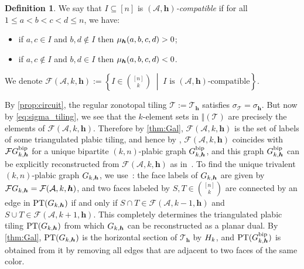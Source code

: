 \documentclass[11pt]{amsart}
\theoremstyle{plain}
\theoremstyle{definition}
\newtheorem{definition}[theorem]{Definition}
\def\A{\mathcal{A}}
\def\h{{\bm{h}}}
\def\PT{\operatorname{PT}}
\def\Tcal{\mathcal{T}}
\def\Tiling{\Tcal}
\let\subset\subseteq
\begin{document}
\def\Compat{\mathcal{F}(\A,k,\h)}
\def\Compatk#1{\mathcal{F}(\A,#1,\h)}
\begin{definition}
We say that $I\subset[n]$ is \emph{$(\A,\h)$-compatible} if for all $1\leq a<b<c<d\leq n$, we have:
\begin{itemize}
\item if $a,c\in I$ and $b,d\notin I$ then $\muh(a,b,c,d)>0$;
\item if $a,c\notin I$ and $b,d\in I$ then $\muh(a,b,c,d)<0$.
\end{itemize}
We denote  $\Compat:=\left\{I\in{[n]\choose k}\;\middle|\; \text{$I$ is $(\A,\h)$-compatible} \right\}$.
\end{definition}


By \cref{prop:circuit}, the regular zonotopal tiling $\Tiling:=\Tiling_\h$ satisfies 
$\sigma_\Tiling=\sigma_\h$.  But now by 
\eqref{eq:sigma_tiling}, we see that the $k$-element sets in  
    $\Vert(\Tiling)$ are precisely the elements of $\Compat$.
Therefore by 
\cref{thm:Gal}, $\Compat$ is the set of labels of some triangulated
plabic tiling, and hence by 
\cite{OPS}, $\Compat$ coincides with 
$\FL{\bip \Gh}$ 
for a unique bipartite $(k,n)$-plabic graph $\bip \Gh$, and this graph $\bip \Gh$ can be explicitly reconstructed from 
$\Compat$ 
as in~\cite[Section~9]{OPS}. To find the unique trivalent $(k,n)$-plabic graph $\Gh$, we use~\cite[Proposition~4.6]{Gal}: the face labels of $\Gh$ are given by $\FL{\Gh}=\Compat$, and two faces labeled by $S,T\in{[n]\choose k}$ are connected by an edge in $\PT(\Gh)$ if and only if $S\cap T\in \Compatk{k-1}$ and $S\cup T\in \Compatk{k+1}$. This completely determines the triangulated plabic tiling $\PT(\Gh)$ from which $\Gh$ can be reconstructed as a planar dual. By 
\cref{thm:Gal},
 $\PT(\Gh)$ is the horizontal section of $\Tiling_\h$ by $H_k$, and $\PT(\bip \Gh)$ is obtained from it by removing all edges that are adjacent to two faces of the same color.
\end{document}
